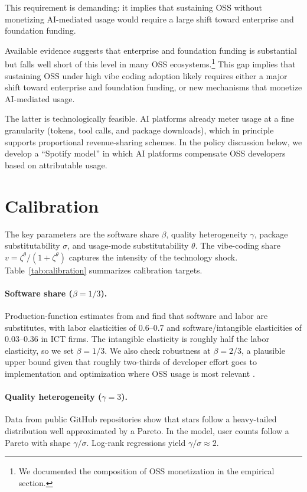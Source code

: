 \documentclass[11pt,a4paper]{article}
\theoremstyle{definition}
\theoremstyle{remark}
\begin{document}
This requirement is demanding: it implies that sustaining OSS without monetizing AI-mediated usage would require a large shift toward enterprise and foundation funding.

Available evidence suggests that enterprise and foundation funding is substantial but falls well short of this level in many OSS ecosystems.\footnote{We documented the composition of OSS monetization in the empirical section.} This gap implies that sustaining OSS under high vibe coding adoption likely requires either a major shift toward enterprise and foundation funding, or new mechanisms that monetize AI-mediated usage.

The latter is technologically feasible. AI platforms already meter usage at a fine granularity (tokens, tool calls, and package downloads), which in principle supports proportional revenue-sharing schemes. In the policy discussion below, we develop a ``Spotify model'' in which AI platforms compensate OSS developers based on attributable usage.

\section{Calibration}\label{calibration}
The key parameters are the software share $\beta$, quality heterogeneity $\gamma$, package substitutability $\sigma$, and usage-mode substitutability $\theta$. The vibe-coding share $v = \zeta^\theta/(1+\zeta^\theta)$ captures the intensity of the technology shock. Table~\ref{tab:calibration} summarizes calibration targets.

\paragraph{Software share ($\beta = 1/3$).} Production-function estimates from \citet{shin-2022-productivity} and \citet{friesenbichler-2024-intangible-capital} find that software and labor are substitutes, with labor elasticities of 0.6--0.7 and software/intangible elasticities of 0.03--0.36 in ICT firms. The intangible elasticity is roughly half the labor elasticity, so we set $\beta = 1/3$. We also check robustness at $\beta = 2/3$, a plausible upper bound given that roughly two-thirds of developer effort goes to implementation and optimization where OSS usage is most relevant \citep{wang-2017-effort-distribution}.

\paragraph{Quality heterogeneity ($\gamma = 3$).} Data from public GitHub repositories show that stars follow a heavy-tailed distribution well approximated by a Pareto. In the model, user counts follow a Pareto with shape $\gamma/\sigma$. Log-rank regressions yield $\gamma/\sigma \approx 2$.
\end{document}
